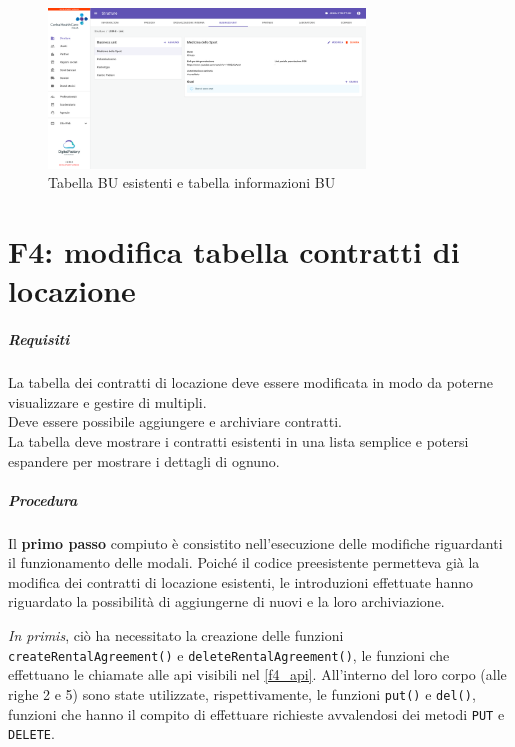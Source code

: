 \begin{figure}[H]
    \centering
    \includegraphics[width= 0.75\textwidth]{images/capitolo5/f1_f2_f3_websiteVisibility_email_links/TabBusinessUnit.png} 
    \caption{Tabella BU esistenti e tabella informazioni BU} 
    \label{fig:TabBusinessUnit}
\end{figure}

\newpage\section{F4: modifica tabella contratti di locazione}
\label{sec:F4: modifica tabella contratti di locazione}
\subparagraph{Requisiti}
La tabella dei contratti di locazione deve essere modificata in modo da poterne visualizzare e gestire di multipli.\\
Deve essere possibile aggiungere e archiviare contratti.\\
La tabella deve mostrare i contratti esistenti in una lista semplice e potersi espandere per mostrare i dettagli di ognuno.

\subparagraph{Procedura}
Il \textbf{primo passo} compiuto è consistito nell'esecuzione delle modifiche riguardanti il funzionamento delle modali. Poiché il codice preesistente permetteva già la modifica dei contratti di locazione esistenti, le introduzioni effettuate hanno riguardato la possibilità di aggiungerne di nuovi e la loro archiviazione.

\textit{In primis}, ciò ha necessitato la creazione delle funzioni \texttt{createRentalAgreement()} e \texttt{deleteRentalAgreement()}, le funzioni che effettuano le chiamate alle \gls{api} visibili nel \autoref{f4_api}. All'interno del loro corpo (alle righe 2 e 5) sono state utilizzate, rispettivamente, le funzioni \texttt{put()} e \texttt{del()}, funzioni che hanno il compito di effettuare richieste avvalendosi dei metodi \texttt{PUT} e \texttt{DELETE}.



